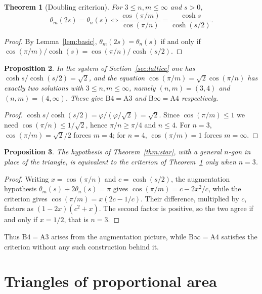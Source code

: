 \documentclass[11pt,a4paper]{article}
\theoremstyle{plain}
\newtheorem{theorem}{Theorem}[section]
\newtheorem{proposition}[theorem]{Proposition}
\theoremstyle{definition}
\theoremstyle{remark}
\begin{document}
\begin{theorem}[Doubling criterion]\label{thm:double}
For $3\le n,m\le\infty$ and $s>0$,
\[
  \theta_m(2s)=\theta_n(s)
  \iff
  \frac{\cos(\pi/m)}{\cos(\pi/n)}=\frac{\cosh s}{\cosh(s/2)} .
\]
\end{theorem}

\begin{proof}
By Lemma~\ref{lem:basic}, $\theta_m(2s)=\theta_n(s)$ if and only if
$\cos(\pi/m)/\cosh(s)=\cos(\pi/n)/\cosh(s/2)$.
\end{proof}

\begin{proposition}\label{prop:twoonly}
In the system of Section~\ref{sec:lattice} one has
$\cosh s/\cosh(s/2)=\sqrt2$, and the equation
$\cos(\pi/m)=\sqrt2\cos(\pi/n)$ has exactly two solutions with
$3\le n,m\le\infty$, namely $(n,m)=(3,4)$ and $(n,m)=(4,\infty)$. These give
$\mathrm{B}4=\mathrm{A}3$ and $\mathrm{B}\infty=\mathrm{A}4$ respectively.
\end{proposition}

\begin{proof}
$\cosh s/\cosh(s/2)=\varphi/(\varphi/\sqrt2)=\sqrt2$. Since
$\cos(\pi/m)\le1$ we need $\cos(\pi/n)\le1/\sqrt2$, hence $\pi/n\ge\pi/4$ and
$n\le4$. For $n=3$, $\cos(\pi/m)=\sqrt2/2$ forces $m=4$; for $n=4$,
$\cos(\pi/m)=1$ forces $m=\infty$.
\end{proof}

\begin{proposition}
The hypothesis of Theorem~\ref{thm:star}, with a general $n$-gon in place of the
triangle, is equivalent to the criterion of Theorem~\ref{thm:double} only when
$n=3$.
\end{proposition}

\begin{proof}
Writing $x=\cos(\pi/n)$ and $c=\cosh(s/2)$, the augmentation hypothesis
$\theta_m(s)+2\theta_n(s)=\pi$ gives $\cos(\pi/m)=c-2x^{2}/c$, while the
criterion gives $\cos(\pi/m)=x(2c-1/c)$. Their difference, multiplied by $c$,
factors as $(1-2x)(c^{2}+x)$. The second factor is positive, so the two agree if
and only if $x=1/2$, that is $n=3$.
\end{proof}

Thus $\mathrm{B}4=\mathrm{A}3$ arises from the augmentation picture, while
$\mathrm{B}\infty=\mathrm{A}4$ satisfies the criterion without any such
construction behind it.

\section{Triangles of proportional area}\label{sec:rfamily}
\end{document}
